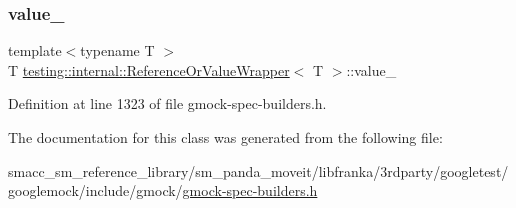 \subsubsection{\texorpdfstring{value\+\_\+}{value\_}}
{\footnotesize\ttfamily template$<$typename T $>$ \\
T \hyperlink{classtesting_1_1internal_1_1ReferenceOrValueWrapper}{testing\+::internal\+::\+Reference\+Or\+Value\+Wrapper}$<$ T $>$\+::value\+\_\+\hspace{0.3cm}{\ttfamily [private]}}



Definition at line 1323 of file gmock-\/spec-\/builders.\+h.



The documentation for this class was generated from the following file\+:\begin{DoxyCompactItemize}
\item 
smacc\+\_\+sm\+\_\+reference\+\_\+library/sm\+\_\+panda\+\_\+moveit/libfranka/3rdparty/googletest/googlemock/include/gmock/\hyperlink{gmock-spec-builders_8h}{gmock-\/spec-\/builders.\+h}\end{DoxyCompactItemize}
